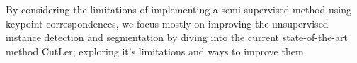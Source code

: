 By considering the limitations of implementing a semi-supervised method using keypoint correspondences, we focus mostly on improving the unsupervised instance detection and segmentation by diving into the current state-of-the-art method CutLer\cite{wang2023cut}; exploring it's limitations and ways to improve them.
 



